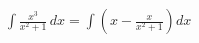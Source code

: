 \documentclass[preview]{standalone}
\begin{document}
\begin{align*}
\int \frac{x^3}{x^2 + 1} \, dx = \int \left( x - \frac{x}{x^2 + 1} \right) dx
\end{align*}
\end{document}
